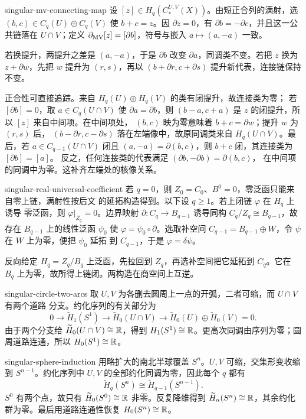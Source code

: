 \begin{solution}{singular-mv-connecting-map}
设 $[z]\in H_q(C_*^{U,V}(X))$。由短正合列的满射，选
$(b,c)\in C_q(U)\oplus C_q(V)$ 使 $b+c=z$。因 $\partial z=0$，有
$\partial b=-\partial c$，并且这一公共链落在 $U\cap V$；定义
$\partial_{\rm MV}[z]=[\partial b]$，符号与嵌入 $a\mapsto(a,-a)$ 一致。

若换提升，两提升之差是 $(a,-a)$，于是 $\partial b$ 改变
$\partial a$，同调类不变。若把 $z$ 换为 $z+\partial w$，先把 $w$ 提升为
$(r,s)$，再以 $(b+\partial r,c+\partial s)$ 提升新代表，连接链保持不变。

正合性可直接追踪。来自 $H_q(U)\oplus H_q(V)$ 的类有闭提升，故连接类为零；
若 $[\partial b]=0$，取 $a\in C_q(U\cap V)$ 使 $\partial a=\partial b$，则
$(b-a,c+a)$ 是 $z$ 的闭提升，所以 $[z]$ 来自中间项。在中间项处，
$(b,c)$ 映为零意味着 $b+c=\partial w$；提升 $w$ 为 $(r,s)$ 后，
$(b-\partial r,c-\partial s)$ 落在左端像中，故原同调类来自
$H_q(U\cap V)$。最后，若 $a\in C_{q-1}(U\cap V)$ 闭且
$(a,-a)=\partial(b,c)$，则 $b+c$ 闭，其连接类为 $[\partial b]=[a]$。
反之，任何连接类的代表满足 $(\partial b,-\partial b)=\partial(b,c)$，
在中间项的同调中为零。这补齐左端处的核像关系。
\end{solution}

\begin{solution}{singular-real-universal-coefficient}
若 $q=0$，则 $Z_0=C_0$、$B^0=0$，零泛函只能来自零上链，满射性按后文
的延拓构造得到。以下设 $q\ge1$。若上闭链 $\varphi$ 在 $H_q$ 上诱导
零泛函，则 $\varphi|_{Z_q}=0$。边界映射
$\partial:C_q\to B_{q-1}$ 诱导同构
$C_q/Z_q\cong B_{q-1}$，故存在 $B_{q-1}$ 上的线性泛函 $\psi_0$ 使
$\varphi=\psi_0\circ\partial$。选取补空间
$C_{q-1}=B_{q-1}\oplus W$，令 $\psi$ 在 $W$ 上为零，便把 $\psi_0$ 延拓
到 $C_{q-1}$，于是 $\varphi=\delta\psi$。

反向给定 $H_q=Z_q/B_q$ 上泛函，先拉回到 $Z_q$，再选补空间把它延拓到
$C_q$。它在 $B_q$ 上为零，故所得上链闭。两构造在商空间上互逆。
\end{solution}

\begin{solution}{singular-circle-two-arcs}
取 $U,V$ 为各删去圆周上一点的开弧，二者可缩，而 $U\cap V$ 有两个道路
分支。约化序列的有关部分为
\[
 0\to\widetilde H_1(S^1)\to\widetilde H_0(U\cap V)
 \to\widetilde H_0(U)\oplus\widetilde H_0(V)=0.
\]
由于两个分支给 $\widetilde H_0(U\cap V)\cong\mathbb{R}$，得到
$H_1(S^1)\cong\mathbb{R}$。更高次同调由序列为零；圆周道路连通，所以
$H_0(S^1)\cong\mathbb{R}$。
\end{solution}

\begin{solution}{singular-sphere-induction}
用略扩大的南北半球覆盖 $S^n$。$U,V$ 可缩，交集形变收缩到
$S^{n-1}$。约化序列中 $U,V$ 的全部约化同调为零，因此每个 $q$ 都有
\[
 \widetilde H_q(S^n)\cong\widetilde H_{q-1}(S^{n-1}).
\]
$S^0$ 有两个点，故只有 $\widetilde H_0(S^0)\cong\mathbb{R}$ 非零。反复降维得到
$\widetilde H_n(S^n)\cong\mathbb{R}$，其余约化群为零。最后用道路连通性恢复
$H_0(S^n)\cong\mathbb{R}$。
\end{solution}

